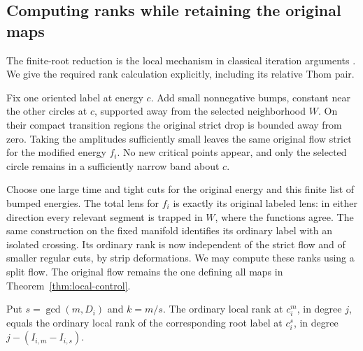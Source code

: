 \subsection{Computing ranks while retaining the original maps}

The finite-root reduction is the local mechanism in classical
iteration arguments \cite{GromollMeyer1969}.  We give the required
rank calculation explicitly, including its relative Thom pair.

Fix one oriented label at energy \(c\).  Add small nonnegative
bumps, constant near the other circles at \(c\), supported away
from the selected neighborhood \(W\).  On their compact
transition regions the original strict drop is bounded away
from zero.  Taking the amplitudes sufficiently small leaves
the same original flow strict for the modified energy \(f_i\).
No new critical points appear, and only the selected circle
remains in a sufficiently narrow band about \(c\).

Choose one large time and tight cuts for the original energy
and this finite list of bumped energies.  The total lens for
\(f_i\) is exactly its original labeled lens: in either
direction every relevant segment is trapped in \(W\), where
the functions agree.  The same construction on the fixed
manifold identifies its ordinary label with an isolated
crossing.  Its ordinary rank is now independent of the strict
flow and of smaller regular cuts, by strip deformations.
We may compute these ranks using a split flow.  The original
flow remains the one defining all maps in
Theorem~\ref{thm:local-control}.

\begin{lemma}\label{lem:local-shift}
Put \(s=\gcd(m,D_i)\) and \(k=m/s\).  The ordinary local rank
at \(c_i^m\), in degree \(j\), equals the ordinary local rank
of the corresponding root label at \(c_i^s\), in degree
\(j-(I_{i,m}-I_{i,s})\).
\end{lemma}

